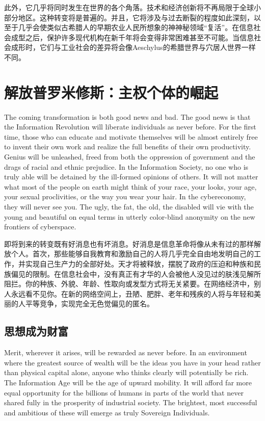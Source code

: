 \begin{Parallel}{97mm}{45mm}
  \ParallelRText
  {\small 此外，它几乎将同时发生在世界的各个角落。技术和经济创新将不再局限于全球小部分地区。这种转变将是普遍的。并且，它将涉及与过去断裂的程度如此深刻，以至于几乎会使类似古希腊人的早期农业人民所想象的神神秘领域“复活”。在信息社会成型之后，保护许多现代机构在新千年将会变得非常困难甚至不可能。当信息社会成形时，它们与工业社会的差异将会像Aeschylus的希腊世界与穴居人世界一样不同。}
  \ParallelPar


\section{解放普罗米修斯：主权个体的崛起}

  \ParallelLText
  {The coming transformation is both good news and bad. The good news is that the Information Revolution will liberate individuals as never before. For the first time, those who can educate and motivate themselves will be almost entirely free to invent their own work and realize the full benefits of their own productivity. Genius will be unleashed, freed from both the oppression of government and the drags of racial and ethnic prejudice. In the Information Society, no one who is truly able will be detained by the ill-formed opinions of others. It will not matter what most of the people on earth might think of your race, your looks, your age, your sexual proclivities, or the way you wear your hair. In the cybereconomy, they will never see you. The ugly, the fat, the old, the disabled will vie with the young and beautiful on equal terms in utterly color-blind anonymity on the new frontiers of cyberspace.  }
  
  \ParallelRText
  {\small 即将到来的转变既有好消息也有坏消息。好消息是信息革命将像从未有过的那样解放个人。首次，那些能够自我教育和激励自己的人将几乎完全自由地发明自己的工作，并实现自己生产力的全部好处。天才将被释放，摆脱了政府的压迫和种族和民族偏见的限制。在信息社会中，没有真正有才华的人会被他人没见过的肤浅见解所阻拦。你的种族、外貌、年龄、性取向或发型方式将无关紧要。在网络经济中，别人永远看不见你。在新的网络空间上，丑陋、肥胖、老年和残疾的人将与年轻和美丽的人平等竞争，实现完全无色觉偏见的匿名。}
  \ParallelPar

\subsection{思想成为财富}


  \ParallelLText
  {Merit, wherever it arises, will be rewarded as never before. In an environment where the greatest source of wealth will be the ideas you have in your head rather than physical capital alone, anyone who thinks clearly will potentially be rich. The Information Age will be the age of upward mobility. It will afford far more equal opportunity for the billions of humans in parts of the world that never shared fully in the prosperity of industrial society. The brightest, most successful and ambitious of these will emerge as truly Sovereign Individuals.  }
  

\end{Parallel}
